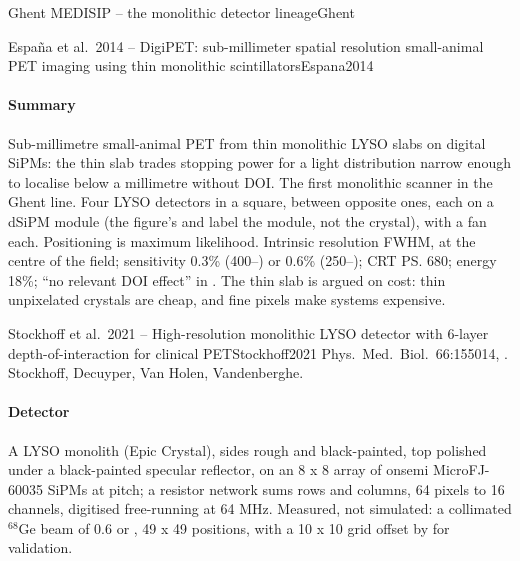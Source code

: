 \begin{programnote}{Ghent MEDISIP -- the monolithic detector lineage}{Ghent}
\begin{papernote}{Espa\~na et al.\ 2014 -- DigiPET: sub-millimeter spatial resolution small-animal PET imaging using thin monolithic scintillators}{Espana2014}
\paragraph{Summary}
Sub-millimetre small-animal PET from thin monolithic LYSO slabs on digital
SiPMs: the thin slab trades stopping power for a light distribution narrow
enough to localise below a millimetre without DOI. The first monolithic
scanner in the Ghent line. Four  LYSO detectors
in a square,  between opposite ones, each on a dSiPM module (the
figure's  and  label the module, not the crystal), with a fan
each. Positioning is maximum likelihood. Intrinsic resolution  FWHM,
 at the centre of the field; sensitivity 0.3\% (400--) or
0.6\% (250--); CRT \ps{680}; energy 18\%; ``no relevant DOI
effect'' in . The thin slab is argued on cost: thin unpixelated crystals
are cheap, and fine pixels make systems expensive.

\end{papernote}

\begin{papernote}{Stockhoff et al.\ 2021 -- High-resolution monolithic LYSO detector with 6-layer depth-of-interaction for clinical PET}{Stockhoff2021}
Phys.\ Med.\ Biol.\ 66:155014, . Stockhoff,
Decuyper, Van Holen, Vandenberghe.

\paragraph{Detector}
A  LYSO monolith (Epic Crystal), sides rough and
black-painted, top polished under a black-painted specular reflector, on an
8 x 8 array of  onsemi MicroFJ-60035 SiPMs at 
pitch; a resistor network sums rows and columns, 64 pixels to 16 channels,
digitised free-running at 64 MHz. Measured, not simulated: a collimated
$^{68}$Ge beam of 0.6 or , 49 x 49 positions, with a 10 x 10 grid
offset by  for validation.


\end{papernote}
\end{programnote}
